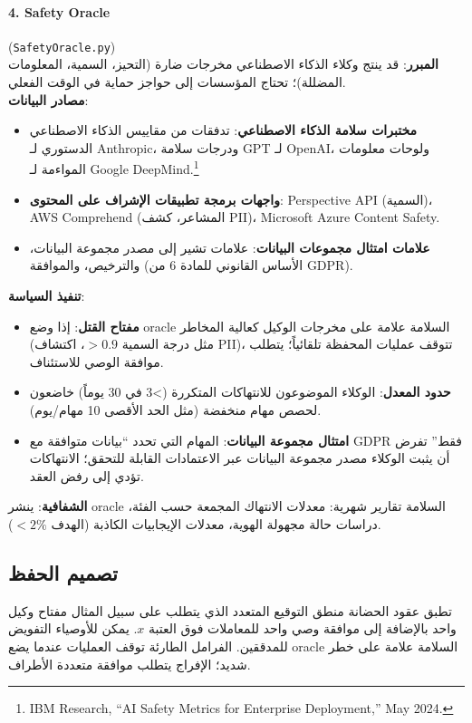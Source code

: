 \documentclass[11pt]{article}
\begin{document}
\paragraph{4. Safety Oracle} (\texttt{SafetyOracle.py})\\
\textbf{المبرر}: قد ينتج وكلاء الذكاء الاصطناعي مخرجات ضارة (التحيز، السمية، المعلومات المضللة)؛ تحتاج المؤسسات إلى حواجز حماية في الوقت الفعلي.\\
\textbf{مصادر البيانات}:
\begin{itemize}[noitemsep]
  \item \textbf{مختبرات سلامة الذكاء الاصطناعي}: تدفقات من مقاييس الذكاء الاصطناعي الدستوري لـ Anthropic، ودرجات سلامة GPT لـ OpenAI، ولوحات معلومات المواءمة لـ Google DeepMind.\footnote{IBM Research, ``AI Safety Metrics for Enterprise Deployment,'' May 2024.}
  \item \textbf{واجهات برمجة تطبيقات الإشراف على المحتوى}: Perspective API (السمية)، AWS Comprehend (المشاعر، كشف PII)، Microsoft Azure Content Safety.
  \item \textbf{علامات امتثال مجموعات البيانات}: علامات تشير إلى مصدر مجموعة البيانات، والترخيص، والموافقة (الأساس القانوني للمادة 6 من GDPR).
\end{itemize}
\textbf{تنفيذ السياسة}:
\begin{itemize}[noitemsep]
  \item \textbf{مفتاح القتل}: إذا وضع oracle السلامة علامة على مخرجات الوكيل كعالية المخاطر (مثل درجة السمية $>0.9$، اكتشاف PII)، تتوقف عمليات المحفظة تلقائياً؛ يتطلب موافقة الوصي للاستئناف.
  \item \textbf{حدود المعدل}: الوكلاء الموضوعون للانتهاكات المتكررة (>3 في 30 يوماً) خاضعون لحصص مهام منخفضة (مثل الحد الأقصى 10 مهام/يوم).
  \item \textbf{امتثال مجموعة البيانات}: المهام التي تحدد ``بيانات متوافقة مع GDPR فقط'' تفرض أن يثبت الوكلاء مصدر مجموعة البيانات عبر الاعتمادات القابلة للتحقق؛ الانتهاكات تؤدي إلى رفض العقد.
\end{itemize}
\textbf{الشفافية}: ينشر oracle السلامة تقارير شهرية: معدلات الانتهاك المجمعة حسب الفئة، دراسات حالة مجهولة الهوية، معدلات الإيجابيات الكاذبة (الهدف $<2\%$).

\subsection{تصميم الحفظ}
تطبق عقود الحضانة منطق التوقيع المتعدد الذي يتطلب على سبيل المثال مفتاح وكيل واحد بالإضافة إلى موافقة وصي واحد للمعاملات فوق العتبة $x$. يمكن للأوصياء التفويض للمدققين. الفرامل الطارئة توقف العمليات عندما يضع oracle السلامة علامة على خطر شديد؛ الإفراج يتطلب موافقة متعددة الأطراف.
\end{document}
